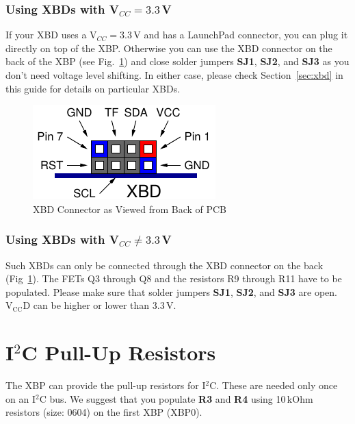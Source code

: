 \documentclass[twoside,11pt]{cergdoc}
\begin{document}
\subsubsection{Using XBDs with V$_{CC} = 3.3$\,V}
If your XBD uses a V$_{CC} = 3.3$\,V and has a LaunchPad connector, you can plug it 
directly on top of the XBP. 
Otherwise you can use the XBD connector on the back of the XBP (see Fig.~\ref{fig:xbd})
and close solder jumpers \textbf{SJ1}, \textbf{SJ2}, and \textbf{SJ3} as you
don't need voltage level shifting.
In either case, please check Section~\ref{sec:xbd} in this guide for details
on particular XBDs. 

\begin{figure}[ht]
  \begin{center}
    \includegraphics[scale=1]{figures/xbd_connector}
    \caption{XBD Connector as Viewed from Back of PCB}\label{fig:xbd}
  \end{center}
\end{figure}

\subsubsection{Using XBDs with V$_{CC} \not= 3.3$\,V}
Such XBDs can only be connected through the XBD connector on the back (Fig~\ref{fig:xbd}).
The FETs Q3 through Q8 and the resistors R9  through R11 have to be populated.
Please make sure that solder jumpers \textbf{SJ1}, \textbf{SJ2}, and \textbf{SJ3} 
are open. $\mathrm{V_{CC}D}$ can be higher or lower than 3.3\,V.

\section{I$^2$C Pull-Up Resistors}
The XBP can provide the pull-up resistors for I$^2$C. These are needed only once on an 
I$^2$C bus. We suggest that you populate \textbf{R3} and \textbf{R4} using 
10\,kOhm resistors (size: 0604) on the first XBP (XBP0).
\end{document}
